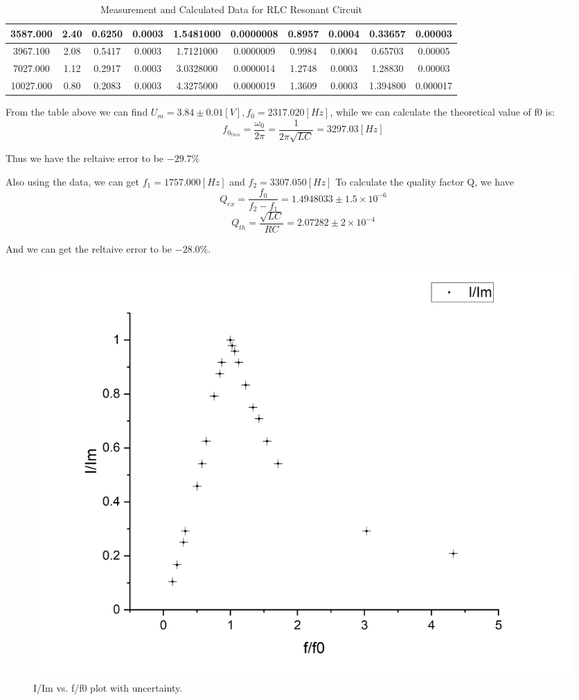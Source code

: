 \documentclass[12pt,a4paper]{article}
\begin{document}
\begin{table}[H]
\begin{tabular}{|c|c|c|c|c|c|c|c|c|c|}
    3587.000       & 2.40           & 0.6250            & 0.0003                 & 1.5481000         & 0.0000008              & 0.8957                   & 0.0004                      & 0.33657                    & 0.00003                       \\ \hline
    3967.100       & 2.08           & 0.5417            & 0.0003                 & 1.7121000         & 0.0000009              & 0.9984                   & 0.0004                      & 0.65703                    & 0.00005                       \\ \hline
    7027.000       & 1.12           & 0.2917            & 0.0003                 & 3.0328000         & 0.0000014              & 1.2748                   & 0.0003                      & 1.28830                & 0.00003                       \\ \hline
    10027.000      & 0.80           & 0.2083            & 0.0003                 & 4.3275000         & 0.0000019              & 1.3609                   & 0.0003                      & 1.394800                   & 0.000017                      \\ \hline
    \end{tabular}
    \caption{Measurement and Calculated Data for RLC Resonant Circuit}
    \label{biggest}
\end{table}
\par From the table above we can find $U_m=3.84\pm 0.01[V],f_0=2317.020[Hz]$, while we can calculate the theoretical value of f0 is:
$$f_{0_{theo}}=\frac{\omega_0}{2\pi}=\frac{1}{2\pi\sqrt{LC}}=3297.03[Hz]$$
\par Thus we have the reltaive error to be $-29.7\%$\par
Also using the data, we can get $f_1=1757.000[Hz]$ and $f_2=3307.050[Hz]$
To calculate the quality factor Q, we have
$$Q_{ex}=\frac{f_0}{f_2-f_1}=1.4948033 \pm 1.5\times 10^{-6}$$
$$Q_{th}=\frac{\sqrt{LC}}{RC}=2.07282\pm 2\times 10^{-4}$$
\par And we can get the reltaive error to be $-28.0\%$.
\begin{figure}[H]
    \centering
    \includegraphics[scale=0.4]{6.jpg}
    \caption{I/Im vs. f/f0 plot with uncertainty.}
    \label{I/Im vs. f/f0 plot with uncertainty.}
\end{figure}
\end{document}
